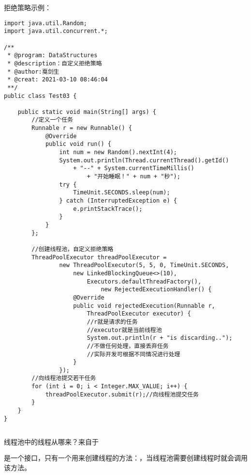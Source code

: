 \documentclass[a4paper]{report}
\begin{document}
拒绝策略示例：

\begin{Verbatim}[frame=single,numbersep=5pt,xleftmargin=1.5em,xrightmargin=1.5em]
import java.util.Random;
import java.util.concurrent.*;

/**
 * @program: DataStructures
 * @description：自定义拒绝策略
 * @author:戛剑生
 * @creat: 2021-03-10 08:46:04
 **/
public class Test03 {

    public static void main(String[] args) {
        //定义一个任务
        Runnable r = new Runnable() {
            @Override
            public void run() {
                int num = new Random().nextInt(4);
                System.out.println(Thread.currentThread().getId()
                    + "--" + System.currentTimeMillis()
                        + "开始睡眠！" + num + "秒");
                try {
                    TimeUnit.SECONDS.sleep(num);
                } catch (InterruptedException e) {
                    e.printStackTrace();
                }
            }
        };

        //创建线程池，自定义拒绝策略
        ThreadPoolExecutor threadPoolExecutor =
                new ThreadPoolExecutor(5, 5, 0, TimeUnit.SECONDS,
                    new LinkedBlockingQueue<>(10),
                        Executors.defaultThreadFactory(),
                            new RejectedExecutionHandler() {
                    @Override
                    public void rejectedExecution(Runnable r,
                        ThreadPoolExecutor executor) {
                        //r就是请求的任务
                        //executor就是当前线程池
                        System.out.println(r + "is discarding..");
                        //不做任何处理，直接丢弃任务
                        //实际开发可根据不同情况进行处理
                    }
                });
        //向线程池提交若干任务
        for (int i = 0; i < Integer.MAX_VALUE; i++) {
            threadPoolExecutor.submit(r);//向线程池提交任务
        }
    }
}\end{Verbatim}
\subsection{}
线程池中的线程从哪来？来自于

是一个接口，只有一个用来创建线程的方法：，当线程池需要创建线程时就会调用该方法。
\end{document}
